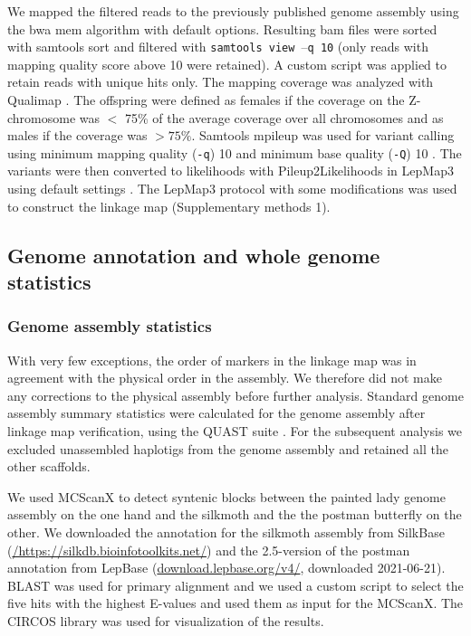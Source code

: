 \documentclass[twocolumn]{bmcart}%
\begin{document}
We mapped the filtered reads to the previously published genome assembly \citep{lohse_genome_2021} using the bwa mem algorithm \citep{liAligningSequenceReads2013} with default options.  Resulting bam files were sorted with samtools sort \citep{liSequenceAlignmentMap2009} and filtered with \texttt{samtools view $–$q 10} (only reads with mapping quality score above 10 were retained). A custom script was applied to retain reads with unique hits only. The mapping coverage was analyzed with Qualimap \citep{okonechnikovQualimapAdvancedMultisample2015}. The offspring were defined as females if the coverage on the Z-chromosome was $<$ 75\% of the average coverage over all chromosomes and as males if the coverage was $>75\%$. Samtools mpileup was used for variant calling using minimum mapping quality (\texttt{-q}) 10 and minimum base quality (\texttt{-Q}) 10 \citep{liSequenceAlignmentMap2009}. The variants were then converted to likelihoods with Pileup2Likelihoods in LepMap3 using default settings \citep{rastasLepMAP3RobustLinkage2017}. The LepMap3 protocol \citep{rastasLepMAP3RobustLinkage2017} with some modifications was used to construct the linkage map (Supplementary methods 1). 

\subsection*{Genome annotation and whole genome statistics}
\subsubsection*{Genome assembly statistics}
With very few exceptions, the order of markers in the linkage map was in agreement with the physical order in the assembly. We therefore did not make any corrections to the physical assembly before further analysis. Standard genome assembly summary statistics were calculated for the genome assembly after linkage map verification, using the QUAST suite \citep{gurevichQUASTQualityAssessment2013}. For the subsequent analysis we excluded unassembled haplotigs from the genome assembly and retained all the other scaffolds. 

We used MCScanX \citep{wangMCScanXToolkitDetection2012} to detect syntenic blocks between the painted lady genome assembly on the one hand and the silkmoth and the the postman butterfly on the other. We downloaded the annotation for the silkmoth assembly from SilkBase (\href{https://silkdb.bioinfotoolkits.net}{/https://silkdb.bioi\-nfotoolkits.net/}) and the 2.5-version of the postman annotation from LepBase (\href{download.lepbase.org/v4/}{download.lepbase.org/v4/}, downloaded 2021-06-21). BLAST was used for primary alignment and we used a custom script to select the five hits with the highest E-values and used them as input for the MCScanX. The CIRCOS library \citep{krzywinskiCircosInformationAesthetic2009} was used for visualization of the results.
\end{document}
